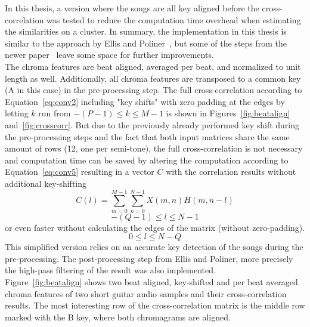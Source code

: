 In this thesis, a version where the songs are all key aligned before the cross-correlation was tested to reduce the computation time overhead when estimating the similarities on a cluster. 
In summary, the implementation in this thesis is similar to the approach by Ellis and Poliner~\cite{chroma3}, but some of the steps from the newer paper~\cite{cover802} leave some space for further improvements.\\ The chroma features are beat aligned, averaged per beat, and normalized to unit length as well. Additionally, all chroma features are transposed to a common key (A in this case) in the pre-processing step. The full cross-correlation according to Equation~\eqref{eq:conv2} including "key shifts" with zero padding at the edges by letting $k$ run from $-(P - 1) \leq k \leq M - 1$ is shown in Figures~\ref{fig:beatalign} and~\ref{fig:crosscorr}. But due to the previously already performed key shift during the pre-processing steps and the fact that both input matrices share the same amount of rows (12, one per semi-tone), the full cross-correlation is not necessary and computation time can be saved by altering the computation according to Equation~\eqref{eq:conv5} resulting in a vector $C$ with the correlation results without additional key-shifting
\begin{equation} \label{eq:conv5}
C(l) = \sum_{m = 0}^{M - 1}{\sum_{n = 0}^{N - 1}{X(m, n)\overline{H}(m, n - l)}}
\end{equation}
\begin{equation} \label{eq:conv6}
-(Q - 1) \leq l \leq N - 1
\end{equation}
or even faster without calculating the edges of the matrix (without zero-padding).
\begin{equation} \label{eq:conv7}
0 \leq l \leq N - Q
\end{equation}
\noindent This simplified version relies on an accurate key detection of the songs during the pre-processing. The post-processing step from Ellis and Poliner, more precisely the high-pass filtering of the result was also implemented.\\
Figure~\ref{fig:beatalign} shows two beat aligned, key-shifted and per beat averaged chroma features of two short guitar audio samples and their cross-correlation results. The most interesting row of the cross-correlation matrix is the middle row marked with the B key, where both chromagrams are aligned. %
